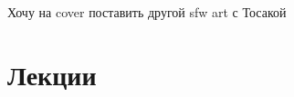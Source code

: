 \documentclass[a4paper]{article}
\begin{document}
  

  \todo Хочу на cover поставить другой sfw art с Тосакой

  \section{Лекции}
  
  
\end{document}
